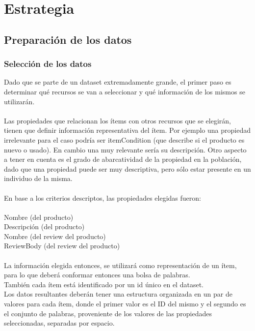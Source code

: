 \section{Estrategia}

\subsection{Preparación de los datos}

\subsubsection{Selección de los datos}
Dado que se parte de un dataset extremadamente grande, el primer paso es determinar qué recursos se van a seleccionar y qué información 
de los mismos se utilizarán.\\
\\
Las propiedades que relacionan los ítems con otros recursos que se elegirán, tienen que definir información representativa del ítem. 
Por ejemplo una propiedad irrelevante para el caso podría ser itemCondition (que describe si el producto es nuevo o usado). 
En cambio una muy relevante sería su descripción. 
Otro aspecto a tener en cuenta es el grado de abarcatividad de la propiedad en la población, dado que una propiedad puede ser muy descriptiva, pero sólo estar 
presente en un individuo de la misma.\\
\\
En base a los criterios descriptos, las propiedades elegidas fueron:\\\\
Nombre (del producto)\\
Descripción (del producto)\\
Nombre (del review del producto) \\
ReviewBody (del review del producto) \\
\\
La información elegida entonces, se utilizará como representación de un ítem, para lo que deberá conformar entonces una bolsa de palabras.\\
También cada ítem está identificado por un id único en el dataset.\\ 
Los datos resultantes deberán tener una estructura organizada en un par de valores para cada ítem, donde el primer valor es el ID del mismo
y el segundo es el conjunto de palabras, proveniente de los valores de las propiedades seleccionadas, separadas por espacio.\\

